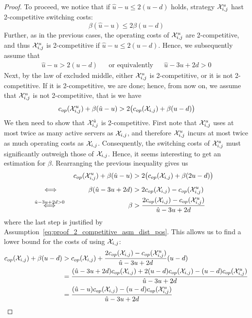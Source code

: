 \begin{proof}
To proceed, we notice that if $\hat{u}-u\le2(u-d)$ holds, strategy $\mathcal{X}_{i,j}^u$ hast 2-competitive switching costs:
\begin{equation*}
	\beta(\hat{u}-u)\le2\beta(u-d)
\end{equation*}
Further, as in the previous cases, the operating costs of $\mathcal{X}_{i,j}^u$ are 2-competitive, and thus $\mathcal{X}_{i,j}^u$ is 2-competitive if $\hat{u}-u\le2(u-d)$. Hence, we subsequently assume that 
\begin{align}\label{eq:proof_2_competitive_asm_dist_pos}
	\hat{u}-u>2(u-d)&&\text{or equivalently}&&\hat{u}-3u+2d>0
\end{align}
Next, by the law of excluded middle, either $\mathcal{X}_{i,j}^u$ is 2-competitive, or it is not 2-competitive. If it is 2-competitive, we are done; hence, from now on, we assume that $\mathcal{X}_{i,j}^u$ is not 2-competitive, that is we have 
\begin{equation*}
	c_{op}(\mathcal{X}_{i,j}^u)+\beta(\hat{u}-u)>2\bigl(c_{op}(\mathcal{X}_{i,j})+\beta(u-d)\bigr)
\end{equation*}
We then need to show that $\mathcal{X}_{i,j}^{\hat{u}}$ is 2-competitive.
First note that $\mathcal{X}_{i,j}^u$ uses at most twice as many active servers as $\mathcal{X}_{i,j}$, and therefore $\mathcal{X}_{i,j}^u$ incurs at most twice as much operating costs as $\mathcal{X}_{i,j}$. Consequently, the switching costs of $\mathcal{X}_{i,j}^u$ must significantly outweigh those of $\mathcal{X}_{i,j}$. Hence, it seems interesting to get an estimation for $\beta$. Rearranging the previous inequality gives us
\begin{align*}
	&&\opcosts(\mx_{i,j}^u)+\beta(\hat{u}-u)&>2\bigl(\opcosts(\mx_{i,j})+\beta(2u-d)\bigr)&\\
	&\stackrel{\phantom{\hat{u}-3u+2d)>0}}{\iff}&\beta(\hat{u}-3u+2d)&>2\opcosts(\mx_{i,j})-\opcosts(\mx_{i,j}^u)&\\
	&\stackrel{\hat{u}-3u+2d>0}{\iff}&\beta&>\frac{2\opcosts(\mx_{i,j})-\opcosts(\mx_{i,j}^u)}{\hat{u}-3u+2d}
\end{align*}
where the last step is justified by Assumption~\eqref{eq:proof_2_competitive_asm_dist_pos}.
This allows us to find a lower bound for the costs of using $\mathcal{X}_{i,j}$:
\begin{align*}
	\opcosts(\mx_{i,j})+\beta(u-d)&>\opcosts(\mx_{i,j})+\frac{2\opcosts(\mx_{i,j})-\opcosts(\mx_{i,j}^u)}{\hat{u}-3u+2d}(u-d)\\
	&=\frac{(\hat{u}-3u+2d)\opcosts(\mx_{i,j})+2(u-d)\opcosts(\mx_{i,j})-(u-d)\opcosts(\mx_{i,j}^u)}{\hat{u}-3u+2d}\\
	&=\frac{(\hat{u}-u)\opcosts(\mx_{i,j})-(u-d)\opcosts(\mx_{i,j}^u)}{\hat{u}-3u+2d}

\end{align*}
\end{proof}

